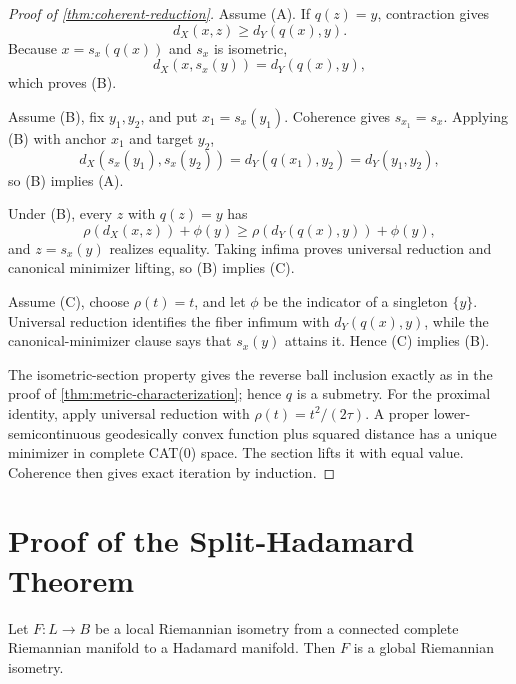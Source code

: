 \begin{proof}[Proof of \cref{thm:coherent-reduction}]
Assume (A).  If \(q(z)=y\), contraction gives
\[
  d_X(x,z)\ge d_Y(q(x),y).
\]
Because \(x=s_x(q(x))\) and \(s_x\) is isometric,
\[
  d_X(x,s_x(y))=d_Y(q(x),y),
\]
which proves (B).

Assume (B), fix \(y_1,y_2\), and put \(x_1=s_x(y_1)\).  Coherence gives
\(s_{x_1}=s_x\).  Applying (B) with anchor \(x_1\) and target \(y_2\),
\[
  d_X(s_x(y_1),s_x(y_2))
  =d_Y(q(x_1),y_2)=d_Y(y_1,y_2),
\]
so (B) implies (A).

Under (B), every \(z\) with \(q(z)=y\) has
\[
  \rho(d_X(x,z))+\phi(y)
  \ge \rho(d_Y(q(x),y))+\phi(y),
\]
and \(z=s_x(y)\) realizes equality.  Taking infima proves universal
reduction and canonical minimizer lifting, so (B) implies (C).

Assume (C), choose \(\rho(t)=t\), and let \(\phi\) be the indicator of a
singleton \(\{y\}\).  Universal reduction identifies the fiber infimum with
\(d_Y(q(x),y)\), while the canonical-minimizer clause says that \(s_x(y)\)
attains it.  Hence (C) implies (B).

The isometric-section property gives the reverse ball inclusion exactly as in
the proof of \cref{thm:metric-characterization}; hence \(q\) is a submetry.
For the proximal identity, apply universal reduction with
\(\rho(t)=t^2/(2\tau)\).  A proper lower-semicontinuous geodesically convex
function plus squared distance has a unique minimizer in complete CAT(0)
space.  The section lifts it with equal value.  Coherence then gives exact
iteration by induction.
\end{proof}

\section{Proof of the Split-Hadamard Theorem}
\label{app:split-proofs}

\begin{lemma}
\label{lem:complete-local-isometry}
Let \(F:L\to B\) be a local Riemannian isometry from a connected complete
Riemannian manifold to a Hadamard manifold.  Then \(F\) is a global
Riemannian isometry.
\end{lemma}

